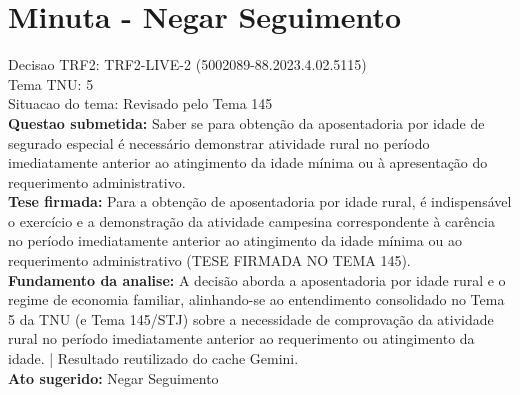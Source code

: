 \documentclass{article}
\begin{document}
\section*{Minuta - Negar Seguimento}
Decisao TRF2: TRF2-LIVE-2 (5002089-88.2023.4.02.5115)\\
Tema TNU: 5\\
Situacao do tema: Revisado pelo Tema 145\\
\textbf{Questao submetida:} Saber se para obtenção da aposentadoria por idade de segurado especial é necessário demonstrar atividade rural no período imediatamente anterior ao atingimento da idade mínima ou à apresentação do requerimento administrativo.\\
\textbf{Tese firmada:} Para a obtenção de aposentadoria por idade rural, é indispensável o exercício e a demonstração da atividade campesina correspondente à carência no período imediatamente anterior ao atingimento da idade mínima ou ao requerimento administrativo (TESE FIRMADA NO TEMA 145).\\
\textbf{Fundamento da analise:} A decisão aborda a aposentadoria por idade rural e o regime de economia familiar, alinhando-se ao entendimento consolidado no Tema 5 da TNU (e Tema 145/STJ) sobre a necessidade de comprovação da atividade rural no período imediatamente anterior ao requerimento ou atingimento da idade. | Resultado reutilizado do cache Gemini.\\
\textbf{Ato sugerido:} Negar Seguimento
\end{document}
